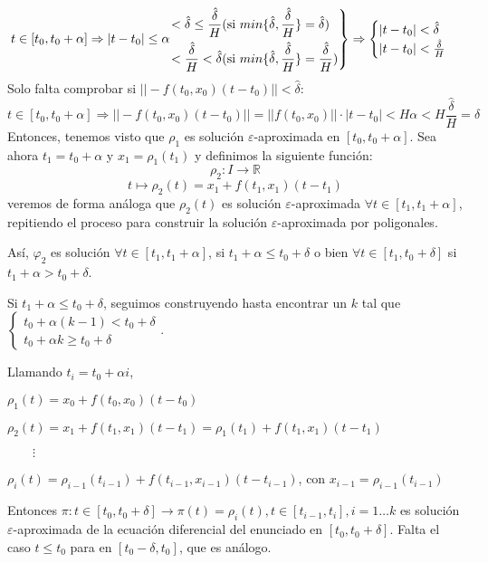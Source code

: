 \documentclass[11pt]{article}
\makeatletter
\theoremstyle{theorem-style}  %
\renewenvironment{proof}[1][\proofname]{\par
	\pushQED{\qed}%
	\normalfont \topsep6\p@\@plus6\p@\relax
	\list{}{%
		\settowidth{\leftmargin}{\quad:\hskip\labelsep}%
		\setlength{\labelwidth}{0pt}%
		\setlength{\itemindent}{-\leftmargin}%
	}%
	\item[\hskip\labelsep\itshape#1\@addpunct{:}]\ignorespaces
}{%
	\popQED\endlist\@endpefalse
}
\theoremstyle{definition-style}
\theoremstyle{example-style}
\newenvironment{rcases}
{\left.\begin{aligned}}
	{\end{aligned}\right\rbrace}
\makeatother
\begin{document}
\begin{proof}
	\[ t \in [t_0, t_0+\alpha]\Rightarrow |t-t_0|\leq \alpha  
	\begin{rcases}
	< \hat{\delta}\leq\frac{\hat{\delta}}{H} \text{(si } min\{ \hat{\delta}, \frac{\hat{\delta}}{H}\}= \hat{\delta})\ \  \\
	< \frac{\hat{\delta}}{H}<\hat{\delta} \text{(si }  min\{ \hat{\delta}, \frac{\hat{\delta}}{H}\}=  \frac{\hat{\delta}}{H})
	\end{rcases}\Rightarrow \begin{cases}
	|t-t_0|<\hat{\delta}\\
	|t-t_0|<\frac{\hat{\delta}}{H}
	\end{cases}
	 \]
	 Solo falta comprobar si $ || -f(t_0,x_0)(t-t_0)||< \hat{\delta} $:	 
	  \[ t \in [t_0, t_0+\alpha]\Rightarrow ||-f(t_0,x_0)(t-t_0)|| = || f(t_0,x_0)||\cdot|t-t_0|<H\alpha < H \frac{\hat{\delta}}{H}= \hat{\delta}   \]
	Entonces, tenemos visto que $ \rho_1 $ es solución $ \varepsilon $-aproximada en $ [t_0,t_0+\alpha] $. Sea ahora $ t_1=t_0+\alpha $ y $ x_1=\rho_1(t_1) $ y definimos la siguiente función:
	\[ \rho_2:I\longrightarrow \mathbb{R} \]
	\[ t \longmapsto \rho_2(t)=x_1+f(t_1,x_1)(t-t_1) \]
	veremos de forma análoga que $ \rho_2(t) $ es solución $ \varepsilon $-aproximada $  \forall t \in [t_1,t_1+\alpha]  $, repitiendo el proceso para construir la solución $ \varepsilon $-aproximada por poligonales. 
	
	
	Así, $ \varphi_2 $ es solución $ \forall t \in [t_1,t_1+\alpha] $, si $ t_1+\alpha\leq t_0+\delta $ o bien $\forall t \in [t_1, t_0+\delta] $ si $ t_1+\alpha >t_0+\delta $. 
	
	Si $ t_1+\alpha \leq t_0 +\delta $, seguimos construyendo hasta encontrar un $ k $ tal que $ \begin{cases}
	t_0+\alpha (k-1)<t_0+\delta\\
	t_0+\alpha k\geq t_0 +\delta
	\end{cases} $.
	
	Llamando $ t_i=t_0+\alpha i $,
	
	\begin{adjustwidth}{1cm}{}
		$ \rho_1(t)=x_0+f(t_0,x_0)(t-t_0) $
	
		$ \rho_2(t)=x_1+f(t_1,x_1)(t-t_1)=\rho_1(t_1)+f(t_1,x_1)(t-t_1) $
	
		$ \qquad \vdots $
	
		$\rho_i (t)=\rho_{i-1}(t_{i-1})+f(t_{i-1},x_{i-1})(t-t_{i-1})  $, con $ x_{i-1}=\rho_{i-1}(t_{i-1}) $
	\end{adjustwidth}

	Entonces $ \pi: t \in [t_0, t_0+\delta]\longrightarrow \pi(t)=\rho_i(t), t \in [t_{i-1}, t_i], i=1\dots k  $ es solución $ \varepsilon $-aproximada de la ecuación diferencial del enunciado en $ [t_0, t_0+\delta] $. Falta el caso $ t\leq t_0 $ para en $ [t_0-\delta, t_0] $, que es análogo.
\end{proof}
\end{document}
